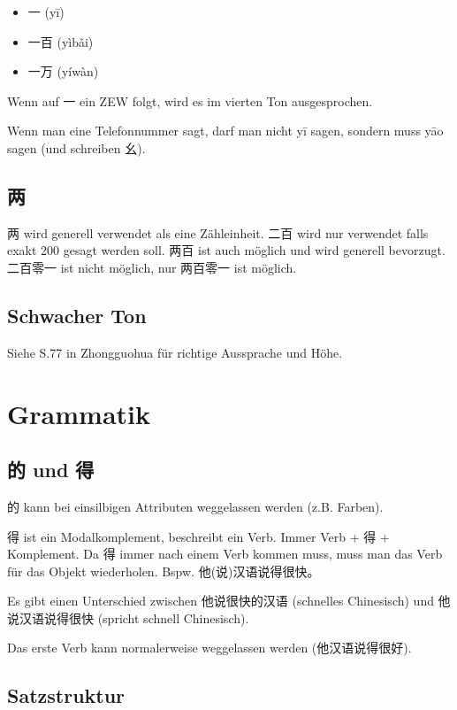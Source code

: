 \documentclass[UTF8]{ctexart}
\begin{document}
\begin{itemize}
    \item 一 (yī)
    \item 一百 (yìbǎi)
    \item 一万 (yíwàn)
\end{itemize}

Wenn auf 一 ein ZEW folgt, wird es im vierten Ton ausgesprochen.

Wenn man eine Telefonnummer sagt, darf man nicht yī sagen, sondern muss yāo sagen (und schreiben 幺).

\subsection{两}

两 wird generell verwendet als eine Zähleinheit. 二百 wird nur verwendet falls exakt 200 gesagt werden soll. 两百 ist auch möglich und wird generell bevorzugt. 二百零一 ist nicht möglich, nur 两百零一 ist möglich.

\subsection{Schwacher Ton}

Siehe S.77 in Zhongguohua für richtige Aussprache und Höhe.

\section{Grammatik}

\subsection{的 und 得}

的 kann bei einsilbigen Attributen weggelassen werden (z.B. Farben).

得 ist ein Modalkomplement, beschreibt ein Verb. Immer Verb + 得 + Komplement. Da 得 immer nach einem Verb kommen muss, muss man das Verb für das Objekt wiederholen. Bspw. 他(说)汉语说得很快。

Es gibt einen Unterschied zwischen 他说很快的汉语 (schnelles Chinesisch) und 他说汉语说得很快 (spricht schnell Chinesisch).

Das erste Verb kann normalerweise weggelassen werden (他汉语说得很好).

\subsection{Satzstruktur}
\end{document}
